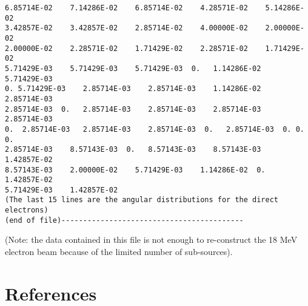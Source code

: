\documentclass[12pt,twoside]{article}
\begin{document}
\begin{verbatim}
6.85714E-02    7.14286E-02    6.85714E-02    4.28571E-02    5.14286E-02
3.42857E-02    3.42857E-02    2.85714E-02    4.00000E-02    2.00000E-02
2.00000E-02    2.28571E-02    1.71429E-02    2.28571E-02    1.71429E-02
5.71429E-03    5.71429E-03    5.71429E-03  0.   1.14286E-02    5.71429E-03
0. 5.71429E-03    2.85714E-03    2.85714E-03    1.14286E-02    2.85714E-03
2.85714E-03  0.   2.85714E-03    2.85714E-03    2.85714E-03    2.85714E-03
0.  2.85714E-03   2.85714E-03    2.85714E-03  0.   2.85714E-03  0. 0. 0.
2.85714E-03    8.57143E-03  0.   8.57143E-03    8.57143E-03    1.42857E-02
8.57143E-03    2.00000E-02    5.71429E-03    1.14286E-02  0.   1.42857E-02
5.71429E-03    1.42857E-02
(The last 15 lines are the angular distributions for the direct electrons)
(end of file)------------------------------------------
\end{verbatim}
(Note: the data contained in this file is not enough to re-construct the 18 MeV electron beam because of the limited number of sub-sources).

\section{References}
\renewcommand{\rightmark}{References}
\vspace*{-1cm}
\setlength{\baselineskip}{0.5cm}


\end{document}
